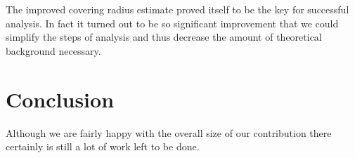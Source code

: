 \documentclass[text.tex]{subfiles}
\begin{document}
The improved covering radius estimate proved itself to be the key for successful analysis. In fact it turned out to be so significant improvement that we could simplify the steps of analysis and thus decrease the amount of theoretical background necessary. 

\section*{Conclusion}
Although we are fairly happy with the overall size of our contribution there certainly is still a lot of work left to be done. 
\end{document}
